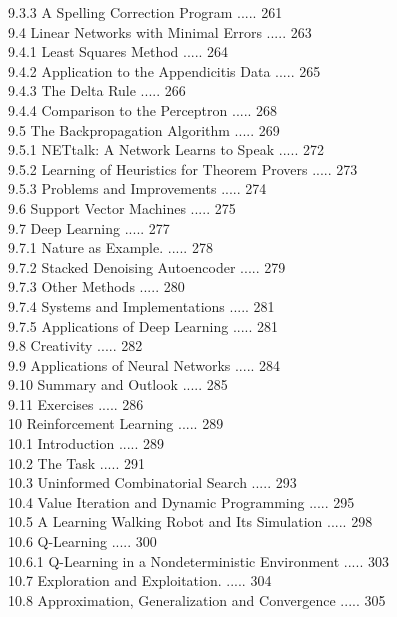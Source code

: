 \documentclass[10pt]{article}
\begin{document}
9.3.3 A Spelling Correction Program ..... 261\\
9.4 Linear Networks with Minimal Errors ..... 263\\
9.4.1 Least Squares Method ..... 264\\
9.4.2 Application to the Appendicitis Data ..... 265\\
9.4.3 The Delta Rule ..... 266\\
9.4.4 Comparison to the Perceptron ..... 268\\
9.5 The Backpropagation Algorithm ..... 269\\
9.5.1 NETtalk: A Network Learns to Speak ..... 272\\
9.5.2 Learning of Heuristics for Theorem Provers ..... 273\\
9.5.3 Problems and Improvements ..... 274\\
9.6 Support Vector Machines ..... 275\\
9.7 Deep Learning ..... 277\\
9.7.1 Nature as Example. ..... 278\\
9.7.2 Stacked Denoising Autoencoder ..... 279\\
9.7.3 Other Methods ..... 280\\
9.7.4 Systems and Implementations ..... 281\\
9.7.5 Applications of Deep Learning ..... 281\\
9.8 Creativity ..... 282\\
9.9 Applications of Neural Networks ..... 284\\
9.10 Summary and Outlook ..... 285\\
9.11 Exercises ..... 286\\
10 Reinforcement Learning ..... 289\\
10.1 Introduction ..... 289\\
10.2 The Task ..... 291\\
10.3 Uninformed Combinatorial Search ..... 293\\
10.4 Value Iteration and Dynamic Programming ..... 295\\
10.5 A Learning Walking Robot and Its Simulation ..... 298\\
10.6 Q-Learning ..... 300\\
10.6.1 Q-Learning in a Nondeterministic Environment ..... 303\\
10.7 Exploration and Exploitation. ..... 304\\
10.8 Approximation, Generalization and Convergence ..... 305\\
\end{document}
